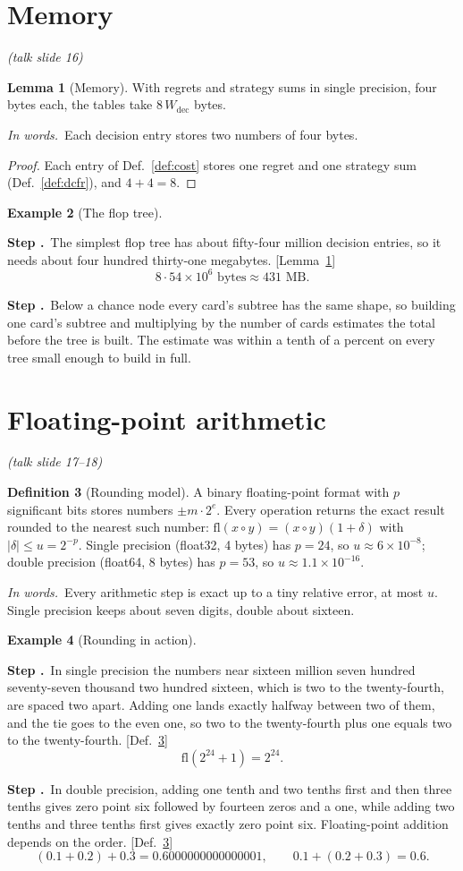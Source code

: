 \documentclass[11pt]{article}
\theoremstyle{definition}
\newtheorem{definition}{Definition}[section]
\newtheorem{example}[definition]{Example}
\newtheorem{lemma}[definition]{Lemma}
\newcommand{\inwords}{\par\smallskip\noindent\textit{In words.}\ }
\newcounter{stp}
\newcommand{\steps}{\setcounter{stp}{0}}
\newcommand{\st}{\stepcounter{stp}\par\medskip\noindent\textbf{Step \arabic{stp}.}\ }
\newcommand{\by}[1]{\hfill{\small\color{blue!50!black}[#1]}}
\newcommand{\Def}[1]{Def.~\ref{#1}}\newcommand{\Lem}[1]{Lemma~\ref{#1}}\newcommand{\Thm}[1]{Thm.~\ref{#1}}
\newcommand{\slide}[1]{\hfill{\small\itshape (talk slide #1)}}
\begin{document}
\section{Memory}\slide{16}
\begin{lemma}[Memory]\label{lem:mem}
With regrets and strategy sums in single precision, four bytes each, the tables take $8\,W_{\text{dec}}$ bytes.
\inwords Each decision entry stores two numbers of four bytes.
\end{lemma}
\begin{proof}
Each entry of \Def{def:cost} stores one regret and one strategy sum (\Def{def:dcfr}), and $4+4=8$.
\end{proof}
\begin{example}[The flop tree]\label{ex:mem}
\steps
\st The simplest flop tree has about fifty-four million decision entries, so it needs about four hundred thirty-one
megabytes. \by{\Lem{lem:mem}}
\[ 8\cdot54\times10^6\text{ bytes}\approx431\text{ MB}. \]
\st Below a chance node every card's subtree has the same shape, so building one card's subtree and multiplying by the
number of cards estimates the total before the tree is built. The estimate was within a tenth of a percent on every tree
small enough to build in full.
\end{example}

\section{Floating-point arithmetic}\label{sec:fp}\slide{17--18}
\begin{definition}[Rounding model]\label{def:fl}
A binary floating-point format with $p$ significant bits stores numbers $\pm m\cdot2^e$. Every operation returns the exact
result rounded to the nearest such number: $\mathrm{fl}(x\circ y)=(x\circ y)(1+\delta)$ with $|\delta|\le u=2^{-p}$. Single precision
(float32, 4 bytes) has $p=24$, so $u\approx6\times10^{-8}$; double precision (float64, 8 bytes) has $p=53$, so $u\approx1.1\times10^{-16}$.
\inwords Every arithmetic step is exact up to a tiny relative error, at most $u$. Single precision keeps about seven
digits, double about sixteen.
\end{definition}

\begin{example}[Rounding in action]\label{ex:fl}
\steps
\st In single precision the numbers near sixteen million seven hundred seventy-seven thousand two hundred sixteen, which is
two to the twenty-fourth, are spaced two apart. Adding one lands exactly halfway between two of them, and the tie goes to
the even one, so two to the twenty-fourth plus one equals two to the twenty-fourth. \by{\Def{def:fl}}
\[ \mathrm{fl}(2^{24}+1)=2^{24}. \]
\st In double precision, adding one tenth and two tenths first and then three tenths gives zero point six followed by
fourteen zeros and a one, while adding two tenths and three tenths first gives exactly zero point six. Floating-point
addition depends on the order. \by{\Def{def:fl}}
\[ (0.1+0.2)+0.3=0.6000000000000001,\qquad 0.1+(0.2+0.3)=0.6. \]
\end{example}
\end{document}
